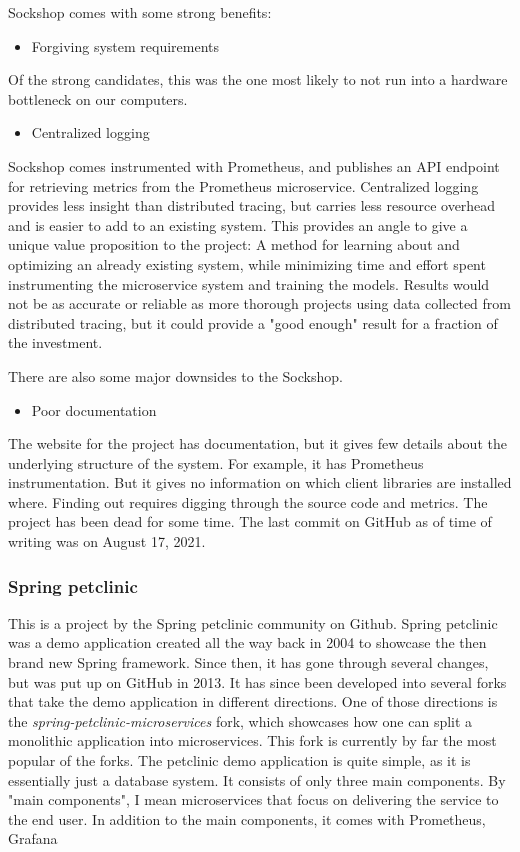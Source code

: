 Sockshop comes with some strong benefits:

\begin{itemize}
    \item Forgiving system requirements
\end{itemize}

Of the strong candidates, this was the one most likely to not run into a hardware bottleneck on our computers. 

\begin{itemize}
    \item Centralized logging
\end{itemize}
Sockshop comes instrumented with Prometheus, and publishes an API endpoint for retrieving metrics from the Prometheus microservice. Centralized logging provides less insight than distributed tracing, but carries less resource overhead and is easier to add to an existing system.
This provides an angle to give a unique value proposition to the project: A method for learning about and optimizing an already existing system, while minimizing time and effort spent instrumenting the microservice system and training the models. Results would not be as accurate or reliable as more thorough projects using data collected from distributed tracing, but it could provide a "good enough" result for a fraction of the investment.

There are also some major downsides to the Sockshop.

\begin{itemize}
    \item Poor documentation
\end{itemize}
The website for the project \cite*{Weaveworks} has documentation, but it gives few details about the underlying structure of the system. 
For example, it has Prometheus instrumentation. But it gives no information on which client libraries are installed where. Finding out requires digging through the source code and metrics.
The project has been dead for some time. The last commit on GitHub as of time of writing was on August 17, 2021. 

\subsubsection*{Spring petclinic}
This is a project by the Spring petclinic community on Github.
Spring petclinic was a demo application created all the way back in 2004 to showcase the then brand new Spring framework.
Since then, it has gone through several changes, but was put up on GitHub in 2013. 
It has since been developed into several forks that take the demo application in different directions.
One of those directions is the \textit{spring-petclinic-microservices} fork, which showcases how one can split a monolithic application into microservices.
This fork is currently by far the most popular of the forks.
The petclinic demo application is quite simple, as it is essentially just a database system. It consists of only three main components. 
By "main components", I mean microservices that focus on delivering the service to the end user.
In addition to the main components, it comes with Prometheus, Grafana
